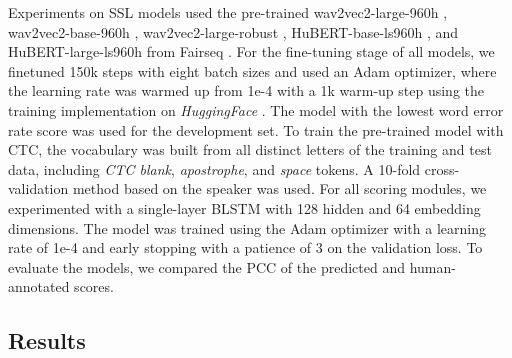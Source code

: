 \documentclass[a4paper]{article}
\begin{document}
Experiments on SSL models used the pre-trained wav2vec2-large-960h \cite{baevski2020wav2vec}, wav2vec2-base-960h \cite{baevski2020wav2vec}, wav2vec2-large-robust \cite{baevski2020wav2vec}, HuBERT-base-ls960h \cite{hsu2021hubert}, and HuBERT-large-ls960h \cite{hsu2021hubert} from Fairseq \cite{ott-etal-2019-fairseq}. For the fine-tuning stage of all models, we finetuned 150k steps with eight batch sizes and used an Adam optimizer, where the learning rate was warmed up from 1e-4 with a 1k warm-up step using the training implementation on \emph{HuggingFace} \cite{wolf-etal-2020-transformers}. The model with the lowest word error rate score was used for the development set. To train the pre-trained model with CTC, the vocabulary was built from all distinct letters of the training and test data, including \emph{CTC blank}, \emph{apostrophe}, and \emph{space} tokens. A 10-fold cross-validation method based on the speaker was used. For all scoring modules, we experimented with a single-layer BLSTM with 128 hidden and 64 embedding dimensions. The model was trained using the Adam optimizer with a learning rate of 1e-4 and early stopping with a patience of 3 on the validation loss. To evaluate the models, we compared the PCC of the predicted and human-annotated scores.




\subsection{Results}
\end{document}

